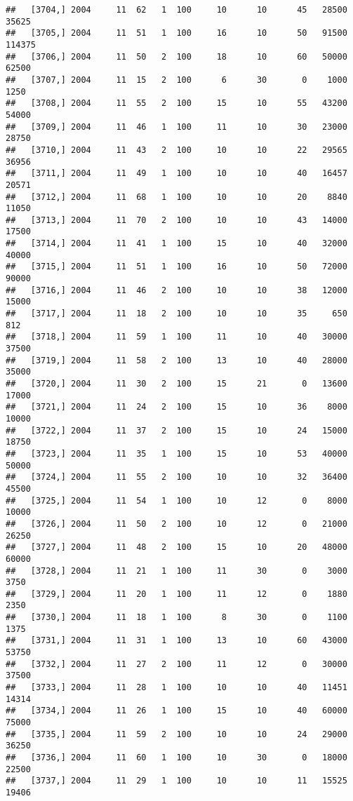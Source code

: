 \documentclass{article}\usepackage[]{graphicx}\usepackage[]{color}
\makeatletter
\newenvironment{kframe}{%
 \def\at@end@of@kframe{}%
 \ifinner\ifhmode%
  \def\at@end@of@kframe{\end{minipage}}%
  \begin{minipage}{\columnwidth}%
 \fi\fi%
 \def\FrameCommand##1{\hskip\@totalleftmargin \hskip-\fboxsep
 \colorbox{shadecolor}{##1}\hskip-\fboxsep
     \hskip-\linewidth \hskip-\@totalleftmargin \hskip\columnwidth}%
 \MakeFramed {\advance\hsize-\width
   \@totalleftmargin\z@ \linewidth\hsize
   \@setminipage}}%
 {\par\unskip\endMakeFramed%
 \at@end@of@kframe}
\newenvironment{knitrout}{}{} %
\makeatother
\begin{document}
\begin{knitrout}
\begin{kframe}
\begin{verbatim}
##   [3704,] 2004     11  62   1  100     10      10      45   28500   35625
##   [3705,] 2004     11  51   1  100     16      10      50   91500  114375
##   [3706,] 2004     11  50   2  100     18      10      60   50000   62500
##   [3707,] 2004     11  15   2  100      6      30       0    1000    1250
##   [3708,] 2004     11  55   2  100     15      10      55   43200   54000
##   [3709,] 2004     11  46   1  100     11      10      30   23000   28750
##   [3710,] 2004     11  43   2  100     10      10      22   29565   36956
##   [3711,] 2004     11  49   1  100     10      10      40   16457   20571
##   [3712,] 2004     11  68   1  100     10      10      20    8840   11050
##   [3713,] 2004     11  70   2  100     10      10      43   14000   17500
##   [3714,] 2004     11  41   1  100     15      10      40   32000   40000
##   [3715,] 2004     11  51   1  100     16      10      50   72000   90000
##   [3716,] 2004     11  46   2  100     10      10      38   12000   15000
##   [3717,] 2004     11  18   2  100     10      10      35     650     812
##   [3718,] 2004     11  59   1  100     11      10      40   30000   37500
##   [3719,] 2004     11  58   2  100     13      10      40   28000   35000
##   [3720,] 2004     11  30   2  100     15      21       0   13600   17000
##   [3721,] 2004     11  24   2  100     15      10      36    8000   10000
##   [3722,] 2004     11  37   2  100     15      10      24   15000   18750
##   [3723,] 2004     11  35   1  100     15      10      53   40000   50000
##   [3724,] 2004     11  55   2  100     10      10      32   36400   45500
##   [3725,] 2004     11  54   1  100     10      12       0    8000   10000
##   [3726,] 2004     11  50   2  100     10      12       0   21000   26250
##   [3727,] 2004     11  48   2  100     15      10      20   48000   60000
##   [3728,] 2004     11  21   1  100     11      30       0    3000    3750
##   [3729,] 2004     11  20   1  100     11      12       0    1880    2350
##   [3730,] 2004     11  18   1  100      8      30       0    1100    1375
##   [3731,] 2004     11  31   1  100     13      10      60   43000   53750
##   [3732,] 2004     11  27   2  100     11      12       0   30000   37500
##   [3733,] 2004     11  28   1  100     10      10      40   11451   14314
##   [3734,] 2004     11  26   1  100     15      10      40   60000   75000
##   [3735,] 2004     11  59   2  100     10      10      24   29000   36250
##   [3736,] 2004     11  60   1  100     10      30       0   18000   22500
##   [3737,] 2004     11  29   1  100     10      10      11   15525   19406

\end{verbatim}
\end{kframe}
\end{knitrout}
\end{document}
